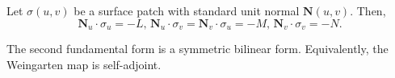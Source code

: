 \begin{lemma}
  Let $\sigma(u, v)$ be a surface patch with standard unit normal
  $\bm{N}(u, v)$. Then,
  \[
    \bm{N}_u \cdot \sigma_u = -L,\,
    \bm{N}_u \cdot \sigma_v = \bm{N}_v \cdot  \sigma_u = -M,\,
    \bm{N}_v \cdot \sigma_v = -N.
  \]
\end{lemma}

\begin{corollary}
  The second fundamental form is a symmetric bilinear form.
  Equivalently, the Weingarten map is self-adjoint.
\end{corollary}